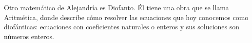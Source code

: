 Otro matemático de Alejandría es Diofanto. Él tiene una obra que se llama Aritmética, donde describe cómo resolver las ecuaciones que hoy conocemos como diofánticas: ecuaciones con coeficientes naturales o enteros y sus soluciones son números enteros.
